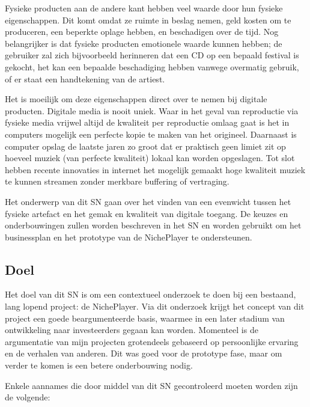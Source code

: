 Fysieke producten aan de andere kant hebben veel waarde door hun fysieke eigenschappen. Dit komt omdat ze ruimte in beslag nemen, geld kosten om te produceren, een beperkte oplage hebben, en beschadigen over de tijd. Nog belangrijker is dat fysieke producten emotionele waarde kunnen hebben; de gebruiker zal zich bijvoorbeeld herinneren dat een CD op een bepaald festival is gekocht, het kan een bepaalde beschadiging hebben vanwege overmatig gebruik, of er staat een handtekening van de artiest.

Het is moeilijk om deze eigenschappen direct over te nemen bij digitale producten. Digitale media is nooit uniek. Waar in het geval van reproductie via fysieke media vrijwel altijd de kwaliteit per reproductie omlaag gaat is het in computers mogelijk een perfecte kopie te maken van het origineel. Daarnaast is computer opslag de laatste jaren zo groot dat er praktisch geen limiet zit op hoeveel muziek (van perfecte kwaliteit) lokaal kan worden opgeslagen. Tot slot hebben recente innovaties in internet het mogelijk gemaakt hoge kwaliteit muziek te kunnen streamen zonder merkbare buffering of vertraging.

Het onderwerp van dit SN gaan over het vinden van een evenwicht tussen het fysieke artefact en het gemak en kwaliteit van digitale toegang. De keuzes en onderbouwingen zullen worden beschreven in het SN en worden gebruikt om het businessplan en het prototype van de NichePlayer te ondersteunen.

\subsection{Doel}
Het doel van dit SN is om een contextueel onderzoek te doen bij een bestaand, lang lopend project: de NichePlayer.  Via dit onderzoek krijgt het concept van dit project een goede beargumenteerde basis, waarmee in een later stadium van ontwikkeling naar investeerders gegaan kan worden. Momenteel is de argumentatie van mijn projecten grotendeels gebaseerd op persoonlijke ervaring en de verhalen van anderen. Dit was goed voor de prototype fase, maar om verder te komen is een betere onderbouwing nodig.

Enkele aannames die door middel van dit SN gecontroleerd moeten worden zijn de volgende:

